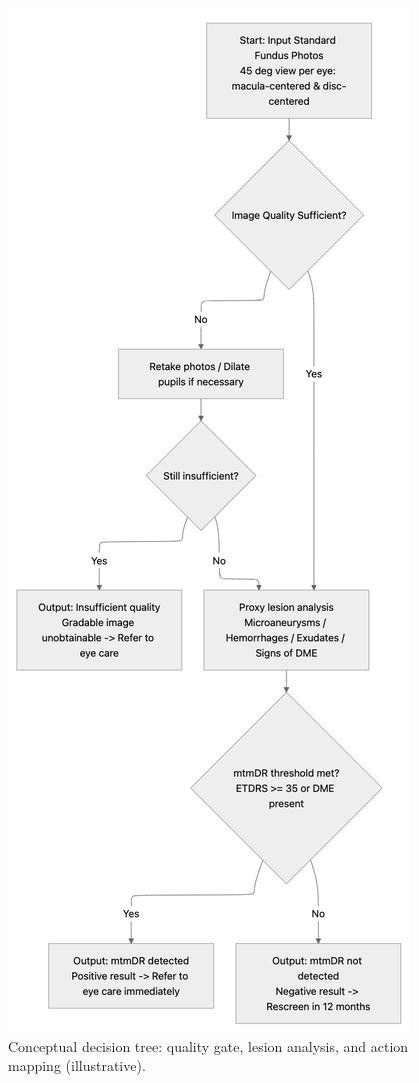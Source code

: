 \documentclass[sigplan,screen]{acmart}
\begin{document}
\begin{figure}[htbp]
\centering
\includegraphics[width=\columnwidth]{Figure2.jpg}
\caption{Conceptual decision tree: quality gate, lesion analysis, and action mapping (illustrative).}
\label{fig:tree}
\end{figure}
\end{document}

